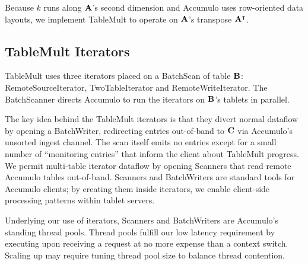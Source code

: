 Because $k$ runs along $\mathbf{A}$'s second dimension 
and Accumulo uses row-oriented data layouts, we implement 
TableMult to operate on $\mathbf{A}$'s transpose $\mathbf{A^{\intercal}}$.



\subsection{TableMult Iterators}
\label{sTableMult}

TableMult uses three iterators placed on a BatchScan of table $\mathbf{B}$:
RemoteSourceIterator, TwoTableIterator and RemoteWriteIterator.
The BatchScanner directs Accumulo to run the iterators on $\mathbf{B}$'s tablets in parallel.

The key idea behind the TableMult iterators is that they divert normal dataflow by opening a BatchWriter,
redirecting entries out-of-band to $\mathbf{C}$ via
Accumulo's unsorted ingest channel. %
The scan itself emits no entries except for a small number of ``monitoring entries'' 
that inform the client about TableMult progress.
We permit multi-table iterator dataflow by opening Scanners 
that read remote Accumulo tables out-of-band.
Scanners and BatchWriters are standard tools for Accumulo clients; 
by creating them inside iterators, we enable client-side processing patterns
within tablet servers.

Underlying our use of iterators, Scanners and BatchWriters are Accumulo's 
standing thread pools. %
Thread pools fulfill our low latency requirement by 
executing upon receiving a request 
at no more expense than a context switch.
Scaling up may require tuning thread pool size
to balance thread contention.



